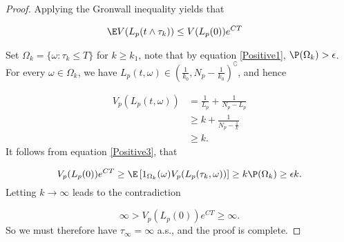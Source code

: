 \begin{proof}
	Applying the Gronwall inequality yields that
	
	\begin{align}\label{Positive3}
		\E V(L_p(t\wedge\tau_k))&\leq V(L_p(0))e^{CT}
	\end{align}

	Set $\Omega_k = \{\omega : \tau_k\leq T\}$ for $k\geq k_1$, note that by equation \eqref{Positive1}, $\P(\Omega_k)> \epsilon$. For every $\omega \in \Omega_k$, we have $L_p(t,\omega)\in \left(\frac{1}{k_0},N_p-\frac{1}{k_0}\right)^{\complement}$, and hence
	
	\begin{align*}
		V_p(L_p(t,\omega))
			&=
				\frac{1}{L_p}+\frac{1}{N_p-L_p}\\
			&\geq 
				k +\frac{1}{N_p-\frac{1}{k}}\\
			&\geq k.
	\end{align*}
%	
	It follows from equation \eqref{Positive3}, that
	
	\begin{equation*}
		V_p(L_p(0))e^{CT}\geq \E \left[1_{\Omega_k}(\omega)V_p(L_p(\tau_k,\omega))\right]\geq k\P (\Omega_k)\geq \epsilon k.
	\end{equation*}
%
	Letting $k\rightarrow \infty$ leads to the contradiction

	\begin{equation*}
		\infty>V_p(L_p(0))e^{CT}\geq \infty.	
	\end{equation*}
%
	So we must therefore have $\tau_\infty=\infty$ a.s., and the proof is complete.	
\end{proof}
